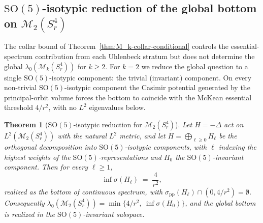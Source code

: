 \documentclass[11pt,letterpaper]{article}
\newtheorem{theorem}{Theorem}[section]
\theoremstyle{definition}
\newcommand{\cM}{\mathcal{M}}
\newcommand{\Lap}{\Delta}
\begin{document}
\iffalse
\subsection{$\mathrm{SO}(5)$-isotypic reduction of the global bottom on $\cM_2(S^4_r)$}\label{sec:isotypic}

The collar bound of Theorem~\ref{thm:M_k-collar-conditional} controls the essential-spectrum contribution from each Uhlenbeck stratum but does not determine the global $\lambda_0(\cM_k(S^4_r))$ for $k \ge 2$. For $k=2$ we reduce the global question to a single $\mathrm{SO}(5)$-isotypic component: the trivial (invariant) component. On every non-trivial $\mathrm{SO}(5)$-isotypic component the Casimir potential generated by the principal-orbit volume forces the bottom to coincide with the McKean essential threshold $4/r^2$, with no $L^2$ eigenvalues below.

\begin{theorem}[$\mathrm{SO}(5)$-isotypic reduction for $\cM_2(S^4_r)$]\label{thm:SO5-isotypic}
Let $H = -\Lap$ act on $L^2(\cM_2(S^4_r))$ with the natural $L^2$ metric, and let $H = \bigoplus_{\ell\ge 0} H_\ell$ be the orthogonal decomposition into $\mathrm{SO}(5)$-isotypic components, with $\ell$ indexing the highest weights of the $\mathrm{SO}(5)$-representations and $H_0$ the $\mathrm{SO}(5)$-invariant component. Then for every $\ell \ge 1$,
\[
\inf\sigma(H_\ell) \;=\; \frac{4}{r^2},
\]
realized as the bottom of continuous spectrum, with $\sigma_{\mathrm{pp}}(H_\ell)\cap (0, 4/r^2) = \emptyset$. Consequently $\lambda_0(\cM_2(S^4_r)) = \min\{4/r^2,\ \inf\sigma(H_0)\}$, and the global bottom is realized in the $\mathrm{SO}(5)$-invariant subspace.
\end{theorem}
\end{document}
